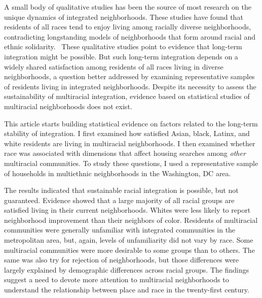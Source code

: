 \documentclass{baderart}
\renewcommand{\needcite}[1][]{%
	\strong{[CITE: %
		\ifthenelse{\equal{#1}{}}{}{: #1}	%
	]}}
\begin{document}
A small body of qualitative studies has been the source of most research on the unique dynamics of integrated neighborhoods. These studies have found that residents of all races tend to enjoy living among racially diverse neighborhoods, contradicting longstanding models of neighborhoods that form around racial and ethnic solidarity.\needcite\ These qualitative studies point to evidence that long-term integration might be possible. But such long-term integration depends on a widely shared satisfaction among residents of all races living in diverse neighborhoods, a question better addressed by examining representative samples of residents living in integrated neighborhoods. Despite its necessity to assess the sustainability of multiracial integration, evidence based on statistical studies of multiracial neighborhoods does not exist. 

This article starts building statistical evidence on factors related to the long-term stability of integration. I first examined how satisfied Asian, black, Latinx, and white residents are living in multiracial neighborhoods. I then examined whether race was associated with dimensions that affect housing searches among \emph{other} multiracial communities. To study these questions, I used a representative sample of households in multiethnic neighborhoods in the Washington, DC area. 

The results indicated that sustainable racial integration is possible, but not guaranteed. Evidence showed that a large majority of all racial groups are satisfied living in their current neighborhoods. Whites were less likely to report neighborhood improvement than their neighbors of color. Residents of multiracial communities were generally unfamiliar with integrated communities in the metropolitan area, but, again, levels of unfamiliarity did not vary by race. Some multiracial communities were more desirable to some groups than to others. The same was also try for rejection of neighborhoods, but those differences were largely explained by demographic differences across racial groups. The findings suggest a need to devote more attention to multiracial neighborhoods to understand the relationship between place and race in the twenty-first century. 
\end{document}
